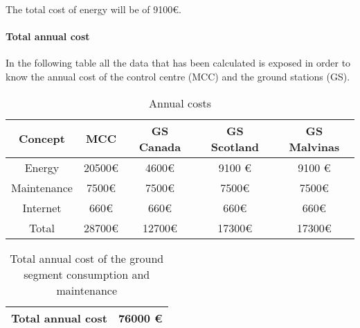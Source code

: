 The total cost of energy will be of 9100\euro. 

\paragraph{Total annual cost}
In the following table all the data that has been calculated is exposed in order to know the annual cost of the control centre (MCC) and the ground stations (GS).
\begin{table}[H]
\begin{center}
\begin{tabular}{|c|c|c|c|c|}
\hline
\textbf{Concept}&\textbf{MCC}&\textbf{GS Canada}&\textbf{GS Scotland}&\textbf{GS Malvinas}\\
\hline
Energy&20500\euro &4600\euro &9100 \euro &9100 \euro\\
\hline
Maintenance&7500\euro &7500\euro &7500\euro &7500\euro \\
\hline
Internet&660\euro &660\euro &660\euro &660\euro\\
\hline
Total&28700\euro &12700\euro &17300\euro &17300\euro \\
\hline
\end{tabular}
\caption{Annual costs}
\end{center}
\end{table}
\begin{table}[H]
\begin{center}
\begin{tabular}{|c|c|}
\hline
\textbf{Total annual cost}&\textbf{76000 \euro}\\
\hline
\end{tabular}
\caption{Total annual cost of the ground segment consumption and maintenance}
\end{center}
\end{table}